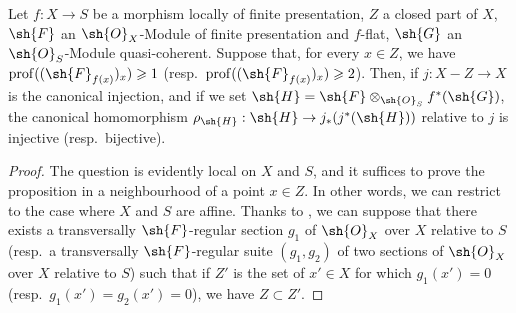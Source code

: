\begin{proposition}[19.9.8]
\label{IV.19.9.8}
Let $f:X\to S$ be a morphism locally of finite presentation, $Z$ a closed part of $X$, $\sh{F}$ an $\sh{O}_X$-Module of finite presentation and $f$-flat, $\sh{G}$ an $\sh{O}_S$-Module quasi-coherent.
Suppose that, for every $x\in Z$, we have $\operatorname{prof}((\sh{F}_{f(x)})_x)\geqslant 1$ (resp.\ $\operatorname{prof}((\sh{F}_{f(x)})_x)\geqslant 2$).
Then, if $j:X-Z\to X$ is the canonical injection, and if we set $\sh{H}=\sh{F}\otimes_{\sh{O}_S}f^*(\sh{G})$, the canonical homomorphism $\rho_{\sh{H}}:\sh{H}\to j_*(j^*(\sh{H}))$ relative to $j$ is injective (resp.\ bijective).
\end{proposition}

\begin{proof}
The question is evidently local on $X$ and $S$, and it suffices to prove the proposition in a neighbourhood of a point $x\in Z$.
In other words, we can restrict to the case where $X$ and $S$ are affine.
Thanks to , we can suppose that there exists a transversally $\sh{F}$-regular section $g_1$ of $\sh{O}_X$ over $X$ relative to $S$ (resp.\ a transversally $\sh{F}$-regular suite $(g_1,g_2)$ of two sections of $\sh{O}_X$ over $X$ relative to $S$) such that if $Z'$ is the set of $x'\in X$ for which $g_1(x')=0$ (resp.\ $g_1(x')=g_2(x')=0$), we have $Z\subset Z'$.


\end{proof}
